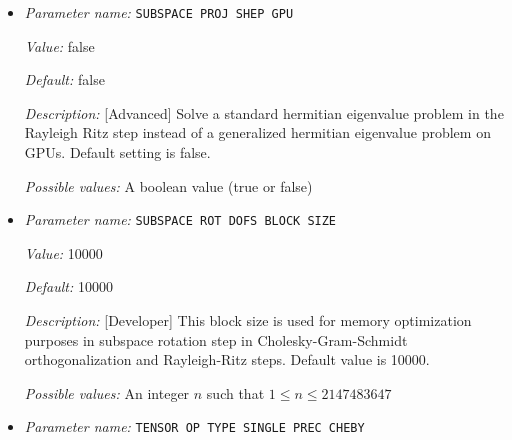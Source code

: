 \begin{itemize}
{\it Value:} 0


{\it Default:} 0


{\it Description:} [Advanced] ScaLAPACK process grid block size. Also sets the block size for ELPA if linked to ELPA. Default value of zero sets a heuristic block size. Note that if ELPA GPU KERNEL is set to true and ELPA is configured to run on GPUs, the SCALAPACK BLOCK SIZE is set to a power of 2.


{\it Possible values:} An integer $n$ such that $0\leq n \leq 300$
\item {\it Parameter name:} {\tt SUBSPACE PROJ SHEP GPU}
\label{parameters:SCF parameters/Eigen_2dsolver parameters/SUBSPACE PROJ SHEP GPU}
\label{parameters:SCF_20parameters/Eigen_2dsolver_20parameters/SUBSPACE_20PROJ_20SHEP_20GPU}


{\it Value:} false


{\it Default:} false


{\it Description:} [Advanced] Solve a standard hermitian eigenvalue problem in the Rayleigh Ritz step instead of a generalized hermitian eigenvalue problem on GPUs. Default setting is false.


{\it Possible values:} A boolean value (true or false)
\item {\it Parameter name:} {\tt SUBSPACE ROT DOFS BLOCK SIZE}
\label{parameters:SCF parameters/Eigen_2dsolver parameters/SUBSPACE ROT DOFS BLOCK SIZE}
\label{parameters:SCF_20parameters/Eigen_2dsolver_20parameters/SUBSPACE_20ROT_20DOFS_20BLOCK_20SIZE}


{\it Value:} 10000


{\it Default:} 10000


{\it Description:} [Developer] This block size is used for memory optimization purposes in subspace rotation step in Cholesky-Gram-Schmidt orthogonalization and Rayleigh-Ritz steps. Default value is 10000.


{\it Possible values:} An integer $n$ such that $1\leq n \leq 2147483647$
\item {\it Parameter name:} {\tt TENSOR OP TYPE SINGLE PREC CHEBY}
\label{parameters:SCF parameters/Eigen_2dsolver parameters/TENSOR OP TYPE SINGLE PREC CHEBY}
\label{parameters:SCF_20parameters/Eigen_2dsolver_20parameters/TENSOR_20OP_20TYPE_20SINGLE_20PREC_20CHEBY}



\end{itemize}
